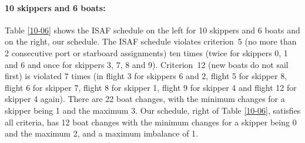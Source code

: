 \documentclass{llncs}
\begin{document}
\paragraph{10 skippers and 6 boats:} Table \ref{10-06} shows the ISAF schedule on the left for 10
skippers and 6 boats and on the right, our schedule.  The ISAF schedule violates criterion~5 (no more
than 2 consecutive port or starboard assignments) ten times (twice for skippers 0, 1 and 6 and once
for skippers 3, 7, 8 and 9).  Criterion~12 (new boats do not sail first) is violated 7 times (in
flight 3 for skippers 6 and 2, flight 5 for skipper 8, flight 6 for skipper 7, flight 8 for skipper
1, flight 9 for skipper 4 and flight 12 for skipper 4 again). There are 22 boat changes, with the
minimum changes for a skipper being 1 and the maximum 3. Our schedule, right of Table \ref{10-06},
satisfies all criteria, has 12 boat changes with the minimum changes for a skipper being 0 and the
maximum 2, and a maximum imbalance of 1.
\end{document}
